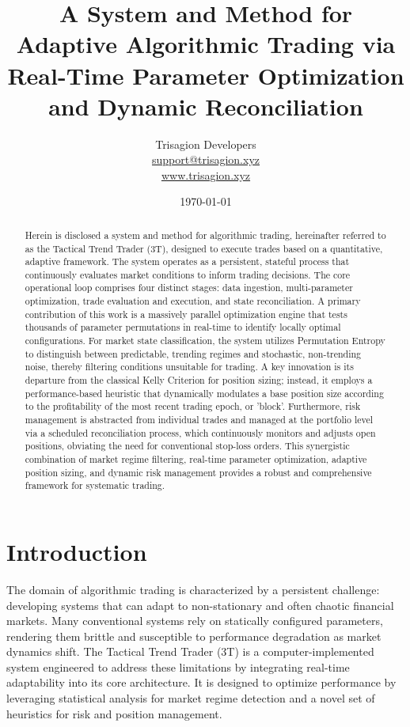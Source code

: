 \documentclass[11pt]{article}
\title{\textbf{A System and Method for Adaptive Algorithmic Trading via Real-Time Parameter Optimization and Dynamic Reconciliation}}
\author{Trisagion Developers \\
        \href{mailto:support@trisagion.xyz}{support@trisagion.xyz} \\
        \url{www.trisagion.xyz}}
\date{\today}
\begin{document}
\maketitle

\begin{abstract}
    Herein is disclosed a system and method for algorithmic trading, hereinafter referred to as the Tactical Trend Trader (3T), designed to execute trades based on a quantitative, adaptive framework. The system operates as a persistent, stateful process that continuously evaluates market conditions to inform trading decisions. The core operational loop comprises four distinct stages: data ingestion, multi-parameter optimization, trade evaluation and execution, and state reconciliation. A primary contribution of this work is a massively parallel optimization engine that tests thousands of parameter permutations in real-time to identify locally optimal configurations. For market state classification, the system utilizes Permutation Entropy to distinguish between predictable, trending regimes and stochastic, non-trending noise, thereby filtering conditions unsuitable for trading. A key innovation is its departure from the classical Kelly Criterion for position sizing; instead, it employs a performance-based heuristic that dynamically modulates a base position size according to the profitability of the most recent trading epoch, or 'block'. Furthermore, risk management is abstracted from individual trades and managed at the portfolio level via a scheduled reconciliation process, which continuously monitors and adjusts open positions, obviating the need for conventional stop-loss orders. This synergistic combination of market regime filtering, real-time parameter optimization, adaptive position sizing, and dynamic risk management provides a robust and comprehensive framework for systematic trading.
\end{abstract}

\section{Introduction}
The domain of algorithmic trading is characterized by a persistent challenge: developing systems that can adapt to non-stationary and often chaotic financial markets. Many conventional systems rely on statically configured parameters, rendering them brittle and susceptible to performance degradation as market dynamics shift. The Tactical Trend Trader (3T) is a computer-implemented system engineered to address these limitations by integrating real-time adaptability into its core architecture. It is designed to optimize performance by leveraging statistical analysis for market regime detection and a novel set of heuristics for risk and position management.
\end{document}
